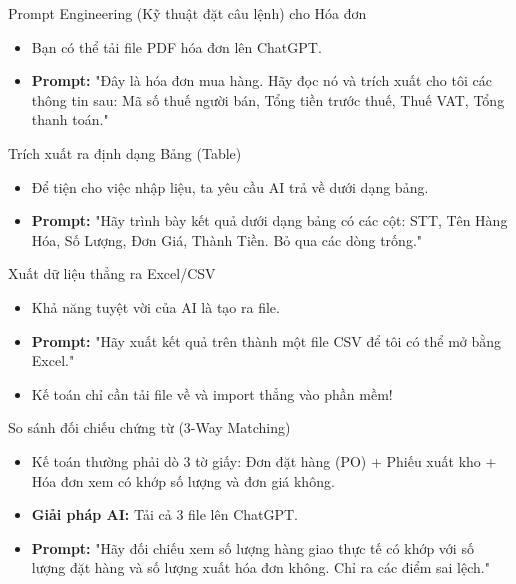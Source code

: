 \documentclass[aspectratio=169]{beamer}
\begin{document}
\begin{frame}{Prompt Engineering (Kỹ thuật đặt câu lệnh) cho Hóa đơn}
    \begin{itemize}
        \item Bạn có thể tải file PDF hóa đơn lên ChatGPT.
        \item \textbf{Prompt:} "Đây là hóa đơn mua hàng. Hãy đọc nó và trích xuất cho tôi các thông tin sau: Mã số thuế người bán, Tổng tiền trước thuế, Thuế VAT, Tổng thanh toán."
    \end{itemize}
\end{frame}


\begin{frame}{Trích xuất ra định dạng Bảng (Table)}
    \begin{itemize}
        \item Để tiện cho việc nhập liệu, ta yêu cầu AI trả về dưới dạng bảng.
        \item \textbf{Prompt:} "Hãy trình bày kết quả dưới dạng bảng có các cột: STT, Tên Hàng Hóa, Số Lượng, Đơn Giá, Thành Tiền. Bỏ qua các dòng trống."
    \end{itemize}
\end{frame}


\begin{frame}{Xuất dữ liệu thẳng ra Excel/CSV}
    \begin{itemize}
        \item Khả năng tuyệt vời của AI là tạo ra file.
        \item \textbf{Prompt:} "Hãy xuất kết quả trên thành một file CSV để tôi có thể mở bằng Excel."
        \item Kế toán chỉ cần tải file về và import thẳng vào phần mềm!
    \end{itemize}
\end{frame}


\begin{frame}{So sánh đối chiếu chứng từ (3-Way Matching)}
    \begin{itemize}
        \item Kế toán thường phải dò 3 tờ giấy: Đơn đặt hàng (PO) + Phiếu xuất kho + Hóa đơn xem có khớp số lượng và đơn giá không.
        \item \textbf{Giải pháp AI:} Tải cả 3 file lên ChatGPT.
        \item \textbf{Prompt:} "Hãy đối chiếu xem số lượng hàng giao thực tế có khớp với số lượng đặt hàng và số lượng xuất hóa đơn không. Chỉ ra các điểm sai lệch."
    \end{itemize}
\end{frame}
\end{document}

